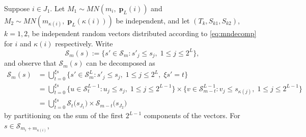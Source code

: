 \documentclass[11pt,draft]{article}
\newcommand{\Ssp}{\mathcal{S}}
\newcommand{\pv}{\mathbf{p}}
\begin{document}
Suppose $i\in J_1$.
Let $M_1 \sim MN(m_i,\; \pv_L(i))$ and
$M_2 \sim MN(m_{\kappa(i)},\; \pv_L(\kappa(i)))$ be independent, and
let $(T_k, S_{k1}, S_{k2})$, $k = 1,2$, be independent random vectors distributed
according to \eqref{eq:mndecomp} for $i$ and $\kappa(i)$ respectively.
Write 
\[ \Ssp_m(s) := \big\{ s' \in \Ssp_m : s'_j \leq s_j,\; 1 \leq j \leq 2^L \big\},
\]
and observe that $\Ssp_m(s)$ can be decomposed as
\begin{align*}
\Ssp_m(s) &= \bigcup_{t = 0}^{\xi s}
\big\{ s' \in \Ssp_m^L: s'_j \leq s_j,\; 1 \leq j \leq 2^L,\; \xi s' = t \big\} \\
&= \bigcup_{t = 0}^{\xi s}
\big\{ u \in \Ssp_t^{L-1}: u_j \leq s_j, \; 1 \leq j \leq 2^{L-1} \} \times
\big\{ v \in \Ssp_{m - t}^{L-1} : v_j \leq s_{\kappa(j)},\;
1 \leq j \leq 2^{L-1} \} \\
&= \bigcup_{t = 0}^{\xi s} \Ssp_{t}\big(s_{J_1}\big) \times
\Ssp_{m - t}\big(s_{J_2}\big) 
\end{align*}
by partitioning on the sum of the first $2^{L-1}$ components of the vectors.
For $s \in \Ssp_{m_i + m_{\kappa(i)}}$,
\end{document}
